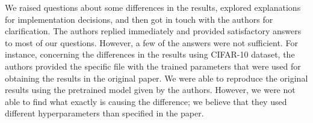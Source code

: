 We raised questions about some differences in the results, explored explanations for implementation decisions, and then got in touch with the authors for clarification. The authors replied immediately and provided satisfactory answers to most of our questions. However, a few of the answers were not sufficient. For instance, concerning the differences in the results using CIFAR-10 dataset, the authors provided the specific file with the trained parameters that were used for obtaining the results in the original paper. We were able to reproduce the original results using the pretrained model given by the authors. However, we were not able to find what exactly is causing the difference; we believe that they used different hyperparameters than specified in the paper.


